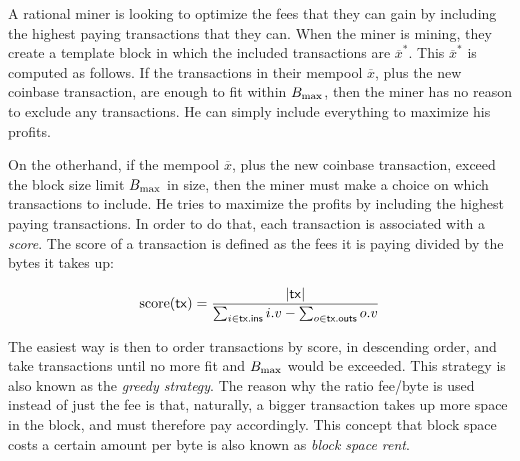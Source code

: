 A rational miner is looking to optimize the fees that they can gain by including the highest
paying transactions that they can. When the miner is mining, they create a template block
in which the included transactions are $\overline{x}^*$. This $\overline{x}^*$ is computed
as follows. If the transactions in their mempool $\overline{x}$, plus
the new coinbase transaction, are enough to fit within $B_\mathrm{max}$, then the miner has no reason
to exclude any transactions. He can simply include everything to maximize his profits.

On the otherhand, if the mempool $\overline{x}$, plus the new coinbase transaction, exceed
the block size limit $B_\mathrm{max}$ in size, then the miner must make a choice on which transactions
to include. He tries to maximize the profits by including the highest paying transactions.
In order to do that, each transaction is associated with a \emph{score}.
The score of a transaction is defined as the fees it is paying divided by the bytes it takes up:

\[
    \mathrm{score}(\mathsf{tx}) = \frac{|\mathsf{tx}|}{\sum_{i \in \mathsf{tx}\textsf{.ins}} i.v - \sum_{o \in \mathsf{tx}\textsf{.outs}} o.v}
\]

The easiest way is then to order transactions by score, in descending order, and take
transactions until no more fit and $B_\mathrm{max}$ would be exceeded. This strategy is also known
as the \emph{greedy strategy}. The reason why the ratio fee/byte
is used instead of just the fee is that, naturally, a bigger transaction takes up more space in
the block, and must therefore pay accordingly. This concept that block space costs a certain
amount per byte is also known as \emph{block space rent}.



